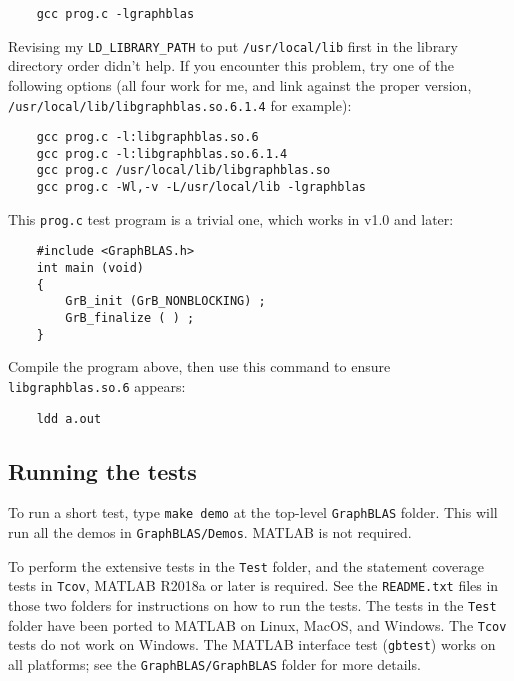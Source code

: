 \documentclass[12pt]{article}
\begin{document}
    {\small
    \begin{verbatim}
    gcc prog.c -lgraphblas \end{verbatim} }

Revising my \verb'LD_LIBRARY_PATH' to put \verb'/usr/local/lib' first in the
library directory order didn't help.  If you encounter this problem, try one of
the following options (all four work for me, and link against the proper
version, \verb'/usr/local/lib/libgraphblas.so.6.1.4' for example):

    {\small
    \begin{verbatim}
    gcc prog.c -l:libgraphblas.so.6
    gcc prog.c -l:libgraphblas.so.6.1.4
    gcc prog.c /usr/local/lib/libgraphblas.so
    gcc prog.c -Wl,-v -L/usr/local/lib -lgraphblas \end{verbatim} }

This \verb'prog.c' test program is a trivial one, which works in v1.0 and
later:

    {\small
    \begin{verbatim}
    #include <GraphBLAS.h>
    int main (void)
    {
        GrB_init (GrB_NONBLOCKING) ;
        GrB_finalize ( ) ;
    } \end{verbatim} }

Compile the program above, then use this command to ensure
\verb'libgraphblas.so.6' appears:

    {\small
    \begin{verbatim}
    ldd a.out \end{verbatim} }

\subsection{Running the tests}

To run a short test, type \verb'make demo' at the top-level \verb'GraphBLAS'
folder.  This will run all the demos in \verb'GraphBLAS/Demos'.  MATLAB is not
required.

To perform the extensive tests in the \verb'Test' folder, and the statement
coverage tests in \verb'Tcov', MATLAB R2018a or later is required.  See the
\verb'README.txt' files in those two folders for instructions on how to run the
tests.  The tests in the \verb'Test' folder have been ported to MATLAB on
Linux, MacOS, and Windows.  The \verb'Tcov' tests do not work on Windows.  The
MATLAB interface test (\verb'gbtest') works on all platforms; see the
\verb'GraphBLAS/GraphBLAS' folder for more details.
\end{document}
